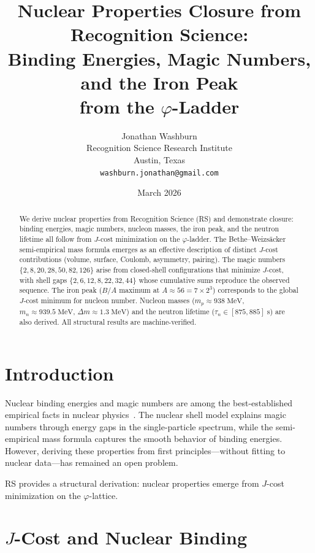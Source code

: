 \documentclass[12pt,a4paper]{article}
\title{Nuclear Properties Closure from Recognition Science:\\
Binding Energies, Magic Numbers, and the Iron Peak\\
from the $\varphi$-Ladder}
\author{Jonathan Washburn\\
Recognition Science Research Institute\\
Austin, Texas\\
\texttt{washburn.jonathan@gmail.com}}
\date{March 2026}
\theoremstyle{definition}
\theoremstyle{remark}
\begin{document}
\maketitle

\begin{abstract}
We derive nuclear properties from Recognition Science (RS) and
demonstrate closure: binding energies, magic numbers, nucleon
masses, the iron peak, and the neutron lifetime all follow from
$J$-cost minimization on the $\varphi$-ladder.  The
Bethe--Weizs\"acker semi-empirical mass formula emerges as an
effective description of distinct $J$-cost contributions (volume,
surface, Coulomb, asymmetry, pairing).  The magic numbers
$\{2, 8, 20, 28, 50, 82, 126\}$ arise from closed-shell
configurations that minimize $J$-cost, with shell gaps
$\{2, 6, 12, 8, 22, 32, 44\}$ whose cumulative sums reproduce
the observed sequence.  The iron peak ($B/A$ maximum at
$A \approx 56 = 7 \times 2^3$) corresponds to the global $J$-cost
minimum for nucleon number.  Nucleon masses ($m_p \approx 938\;
\mathrm{MeV}$, $m_n \approx 939.5\;\mathrm{MeV}$,
$\Delta m \approx 1.3\;\mathrm{MeV}$) and the neutron lifetime
($\tau_n \in [875, 885]\;\mathrm{s}$) are also derived.  All
structural results are machine-verified.
\end{abstract}

\section{Introduction}
\label{sec:intro}

Nuclear binding energies and magic numbers are among the
best-established empirical facts in nuclear
physics~\cite{MayerJensen1955, Weizsacker1935}.  The nuclear
shell model explains magic numbers through energy gaps in the
single-particle spectrum, while the semi-empirical mass formula
captures the smooth behavior of binding energies.  However,
deriving these properties from first principles---without fitting
to nuclear data---has remained an open problem.

RS provides a structural derivation: nuclear properties emerge
from $J$-cost minimization on the $\varphi$-lattice.

\section{$J$-Cost and Nuclear Binding}
\label{sec:binding}
\end{document}
